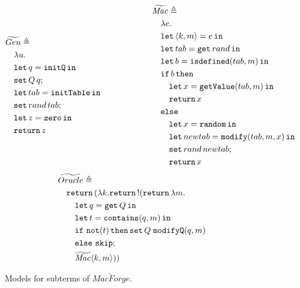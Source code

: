 \begin{figure}[htpb]
    \begin{align*}
        \begin{aligned}
            &\widetilde{Gen} \triangleq \\
            &\quad \lambda u. \\
            &\quad\mathtt{let}\,q=\mathtt{initQ}\,\mathtt{in}\, \\
            &\quad \mathtt{set}\,Q\,q; \\
            &\quad \mathtt{let}\,tab=\mathtt{initTable}\,\mathtt{in}\, \\
            &\quad \mathtt{set}\,rand\,tab; \\
            &\quad \mathtt{let}\,z=\mathtt{zero}\,\mathtt{in}\, \\
            &\quad \mathtt{return}\, z
        \end{aligned}
        \qquad\qquad\qquad
        \begin{aligned}
            &\widetilde{\mathit{Mac}} \triangleq \\
            &\quad\lambda e. \\
            &\quad\mathtt{let}\,\langle k,m \rangle = e\,\mathtt{in}\, \\
            &\quad\mathtt{let}\,tab = \mathtt{get}\,rand\,\mathtt{in}\, \\
            &\quad\mathtt{let}\,b = \mathtt{isdefined}(tab, m)\,\mathtt{in}\, \\
            &\quad\mathtt{if}\, b\, \mathtt{then} \\
            &\quad\quad \mathtt{let}\,x = \mathtt{getValue}(tab, m)\,\mathtt{in}\, \\
            &\quad\quad \mathtt{return}\, x \\
            &\quad\mathtt{else} \\
            &\quad\quad \mathtt{let}\,x = \mathtt{random}\,\mathtt{in}\, \\
            &\quad\quad \mathtt{let}\,newtab = \mathtt{modify}(tab, m, x)\,\mathtt{in}\, \\
            &\quad\quad \mathtt{set}\,rand\,newtab; \\
            &\quad\quad \mathtt{return}\, x
        \end{aligned}
    \end{align*}
    \begin{align*}
        &\widetilde{Oracle} \triangleq \\
        &\quad \mathtt{return}\,(\lambda k.\mathtt{return}\, \mathord{!}(\mathtt{return}\, \lambda m. \\
        &\quad\quad \mathtt{let}\,q=\mathtt{get}\, Q\,\mathtt{in}\, \\
        &\quad\quad \mathtt{let}\,t=\mathtt{contains}(q,m)\,\mathtt{in}\, \\
        &\quad\quad \mathtt{if}\ \mathtt{not}(t)\,\mathtt{then} \,\mathtt{set}\,Q\;\mathtt{modifyQ}(q,m) \\
        &\quad\quad \mathtt{else}\ \mathtt{skip}; \\
        &\quad\quad \mathit{\widetilde{Mac}}\langle k,m \rangle))
    \end{align*}
    \caption{Models for subterms of $\widetilde{MacForge}$.}
    \label{fig:macforgef-subterms}
\end{figure}

